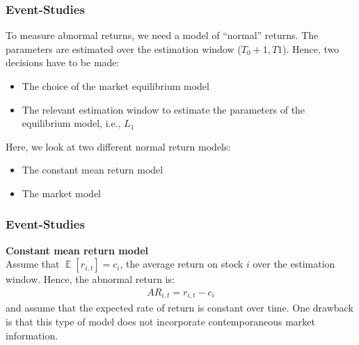 \documentclass[xcolor=dvipsnames, english, 8pt]{beamer}
\DeclareMathOperator{\E}{\mathbb{E}}
\begin{document}
        \begin{frame}
            \frametitle{Event-Studies}
            To measure abnormal returns, we need a model of “normal” returns. The {\color{ubRed}parameters
            are estimated over the estimation window} ($T_0+1,T1$). Hence, two decisions have to be made:
            \begin{itemize}
                \item The choice of the market equilibrium model
                \item The relevant estimation window to estimate the parameters of the equilibrium model, i.e., $L_1$ \vspace{0.25cm}\\
            \end{itemize}
            Here, we look at two different normal return models:
            \begin{itemize}
                \item The constant mean return model
                \item The market model
            \end{itemize}
        \end{frame}

        \begin{frame}
            \frametitle{Event-Studies}
        \textbf{\color{ubRed}Constant mean return model}\vspace{0.25cm}\\
        Assume that $\E[r_{i,t}] = c_i$, the average return on stock $i$ over the estimation window. Hence, the abnormal return is:
        \begin{align}
            AR_{i,t} = r_{i,t}-c_i
        \end{align}
        and assume that the expected rate of return is constant over time. One drawback is that this type of model {\color{ubRed} does not incorporate contemporaneous market information}.
        \end{frame}
\end{document}
